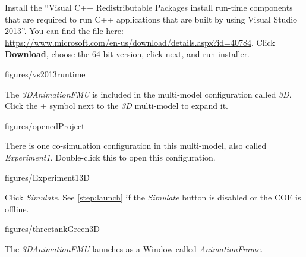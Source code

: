 \documentclass[11pt,a4paper]{../tutorial}
\begin{document}
\begin{instructions}
\item Install the ``Visual C++ Redistributable Packages install run-time components that are required to run C++ applications that are built by using Visual Studio 2013''. You can find the file here: \\ \url{https://www.microsoft.com/en-us/download/details.aspx?id=40784}. Click \textbf{Download}, choose the 64 bit version, click next, and run installer.

    \begin{annotation}[width=0.84\linewidth]{figures/vs2013runtime}
    \end{annotation}



\item The \emph{3DAnimationFMU} is included in the multi-model configuration called \emph{3D}. Click the + symbol next to the \emph{3D} multi-model to expand it.

    \begin{annotation}[width=0.53\linewidth,trim=0 0 250 200,clip]{figures/openedProject}
    \end{annotation}

\item There is one co-simulation configuration in this multi-model, also called \emph{Experiment1}. Double-click this to open this configuration.

    \begin{annotation}[width=0.53\linewidth,trim=0 0 250 200,clip]{figures/Experiment13D}
    \end{annotation}

\newpage
\item Click \emph{Simulate}. See \ref{step:launch} if the \emph{Simulate} button is disabled or the COE is offline.

    \begin{annotation}[width=0.85\linewidth,trim=0 140 0 110,clip]{figures/threetankGreen3D}
    \end{annotation}

\item  The \emph{3DAnimationFMU} launches as a Window called \emph{AnimationFrame}.


\end{instructions}
\end{document}

